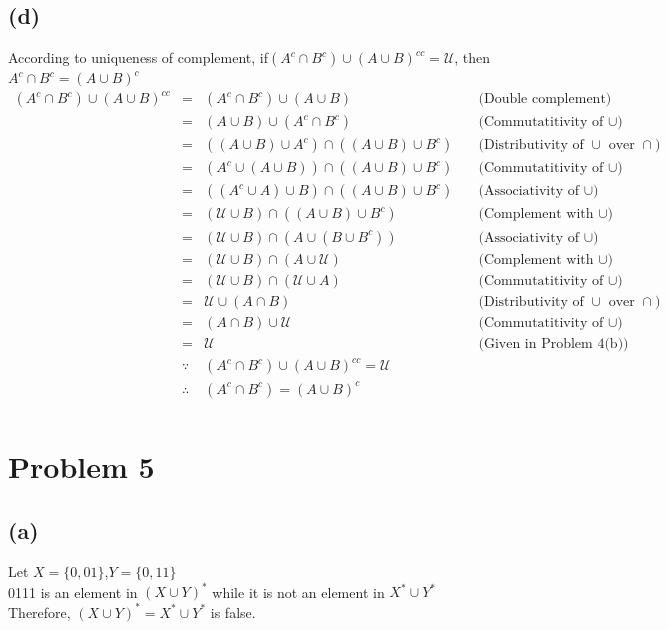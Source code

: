 \documentclass{article} %
\begin{document}
\subsection*{(d)}
According to uniqueness of complement, if$(A^{c}\cap B^{c})\cup (A\cup B)^{cc}=\mathcal{U}$, then $A^{c}\cap B^{c} =(A\cup B)^{c} $
\[\begin{array}{rclr}
(A^{c}\cap B^{c})\cup (A\cup B)^{cc} &=&(A^{c}\cap B^{c})\cup (A\cup B)&\quad\mbox{(Double complement)}\\
&=& (A\cup B)\cup (A^{c}\cap B^{c})&\quad\mbox{(Commutatitivity of $\cup$)}\\
&=&((A\cup B)\cup A^{c})\cap ((A\cup B)\cup B^{c})&\quad\mbox{(Distributivity of $\cup$ over $\cap$)}\\
&=&(A^{c}\cup (A\cup B))\cap ((A\cup B)\cup B^{c})&\quad\mbox{(Commutatitivity of $\cup$)}\\
&=&((A^{c}\cup A)\cup B)\cap ((A\cup B)\cup B^{c})&\quad\mbox{(Associativity of $\cup$)}\\
&=&(\mathcal{U}\cup B)\cap ((A\cup B)\cup B^{c})&\quad\mbox{(Complement with $\cup$)}\\
&=&(\mathcal{U}\cup B)\cap (A\cup (B\cup B^{c}))&\quad\mbox{(Associativity of $\cup$)}\\
&=&(\mathcal{U}\cup B)\cap (A\cup \mathcal{U})&\quad\mbox{(Complement with $\cup$)}\\
&=&(\mathcal{U}\cup B)\cap (\mathcal{U}\cup A)&\quad\mbox{(Commutatitivity of $\cup$)}\\
&=&\mathcal{U}\cup(A \cap B)&\quad\mbox{(Distributivity of $\cup$ over $\cap$)}\\
&=&(A \cap B)\cup \mathcal{U}&\quad\mbox{(Commutatitivity of $\cup$)}\\

&=&\mathcal{U}&\quad\mbox{(Given in Problem 4(b))}\\

&\because& (A^{c}\cap B^{c})\cup (A\cup B)^{cc}=\mathcal{U}\\
&\therefore& (A^{c}\cap B^{c}) =(A\cup B)^{c}\\
\end{array}\]

\section*{Problem 5}
\subsection*{(a)}
Let $X=\{0, 01\}$,$Y=\{0,11\}$\\
0111 is an element in $(X\cup Y)^{*} $ while it is not an element in $X^*\cup Y^*$\\
Therefore, $(X\cup Y)^{*}=X^*\cup Y^*$ is false.\\
\end{document}

